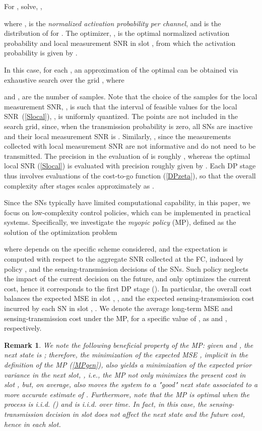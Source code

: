 \documentclass[10pt,twocolumn,twoside]{IEEEtran}
\theoremstyle{plain}
\newtheorem{remark}{Remark}
\begin{document}
 For , solve, ,
  
where , 
is the \emph{normalized activation probability per channel}, and
 is the distribution of  for  \cite[Corollary 1]{MichelusiP1}.
The optimizer, , is the optimal normalized activation probability and local measurement SNR in slot ,
from which the activation probability is given by .
\hfill\QED

In this case, for each ,
 an approximation of the optimal  can be obtained via exhaustive search over the grid 
 , where 
 
and ,  are the number of samples.
 Note that the choice of the samples for the local measurement SNR, , is such that the
 interval of feasible values for the local  SNR~(\ref{Slocal}), , is uniformly quantized.
 The points  are not included in the search grid, since, when the transmission probability is zero, all SNs are inactive and
 their local measurement SNR is .
 Similarly, , since the measurements collected with local measurement SNR  are not informative and do not need to be transmitted.
 The precision in the evaluation of  is roughly ,
 whereas the optimal local SNR (\ref{Slocal}) is evaluated with precision roughly given by .
 Each DP stage thus involves  evaluations of the cost-to-go function (\ref{DPzeta}),
 so that the overall complexity after  stages scales approximately as .

Since the SNs typically have limited computational capability, in this paper, we focus on low-complexity control policies,
which can be implemented in practical systems.
Specifically, we investigate the \emph{myopic policy} (MP), defined as the solution of the optimization problem

where  depends on the specific scheme considered,
and the expectation is 
computed with respect to the aggregate SNR collected at the FC, induced 
by policy , and the sensing-transmission decisions of the SNs.
Such policy neglects the impact of the current decision on the future, and only optimizes the current cost,
hence it corresponds to the first DP stage ().
In particular, the overall cost balances the expected MSE in slot , ,
and the expected sensing-transmission cost incurred by each SN in slot , .
We denote the average long-term MSE and sensing-transmission cost under the MP, for a specific value of , as  and , respectively.
\vspace{-3mm}
\begin{remark}
\label{rem1}
We note the following beneficial property of the MP:
given  and , the next state is ;
therefore, the minimization of the expected MSE ,
implicit in the definition of the MP (\ref{MPgen}), also yields a minimization of the expected prior variance in the next slot, 
, \emph{i.e.}, the MP not only minimizes the present cost in slot ,
but, on average,  also moves  the system to a "good" next state associated to a more accurate estimate of .
Furthermore, note that the MP is optimal when the process  is i.i.d. () and  is i.i.d. over time.
In fact, in this case, the sensing-transmission decision in slot  does not affect the next state  and the future cost, hence  in each slot.
\end{remark}
\end{document}
